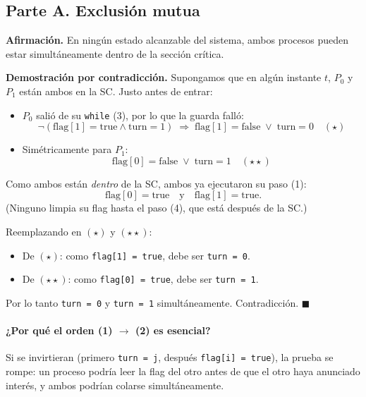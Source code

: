 \documentclass[11pt,a4paper]{article}
\begin{document}
\subsection*{Parte A. Exclusión mutua}

\textbf{Afirmación.} En ningún estado alcanzable del sistema, ambos
procesos pueden estar simultáneamente dentro de la sección crítica.

\textbf{Demostración por contradicción.} Supongamos que en algún
instante $t$, $P_0$ y $P_1$ están ambos en la SC. Justo antes de
entrar:

\begin{itemize}[leftmargin=*,nosep]
    \item $P_0$ salió de su \texttt{while} (3), por lo que la guarda
        falló:
        \[
        \neg(\text{flag}[1] = \text{true} \land \text{turn} = 1)
        \;\Rightarrow\;
        \text{flag}[1] = \text{false} \;\lor\; \text{turn} = 0 \quad (\star)
        \]
    \item Simétricamente para $P_1$:
        \[
        \text{flag}[0] = \text{false} \;\lor\; \text{turn} = 1
        \quad (\star\star)
        \]
\end{itemize}

Como ambos están \emph{dentro} de la SC, ambos ya ejecutaron su paso
(1):
\[
\text{flag}[0] = \text{true} \quad \text{y} \quad \text{flag}[1] = \text{true}.
\]
(Ninguno limpia su flag hasta el paso (4), que está después de la SC.)

Reemplazando en $(\star)$ y $(\star\star)$:

\begin{itemize}[leftmargin=*,nosep]
    \item De $(\star)$: como \texttt{flag[1] = true}, debe ser
        \texttt{turn = 0}.
    \item De $(\star\star)$: como \texttt{flag[0] = true}, debe ser
        \texttt{turn = 1}.
\end{itemize}

Por lo tanto \texttt{turn = 0} y \texttt{turn = 1} simultáneamente.
Contradicción. $\blacksquare$

\paragraph{¿Por qué el orden (1) $\rightarrow$ (2) es esencial?} Si se
invirtieran (primero \texttt{turn = j}, después \texttt{flag[i] = true}),
la prueba se rompe: un proceso podría leer la flag del otro antes de
que el otro haya anunciado interés, y ambos podrían colarse
simultáneamente.
\end{document}
